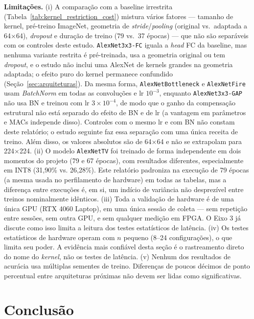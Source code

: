 \documentclass[conference]{IEEEtran}
\begin{document}
\textbf{Limitações.} (i) A comparação com a baseline irrestrita (Tabela~\ref{tab:kernel_restriction_cost})
mistura vários fatores — tamanho de kernel, pré-treino ImageNet, geometria de
\textit{stride}/\textit{pooling} (original vs.\ adaptada a 64$\times$64), \textit{dropout} e duração
de treino (79 vs.\ 37 épocas) — que não são separáveis com os controles deste estudo.
\texttt{AlexNet3x3-FC} iguala a \textit{head} FC da baseline, mas nenhuma variante restrita é
pré-treinada, usa a geometria original ou tem \textit{dropout}, e o estudo não inclui uma AlexNet de
kernels grandes na geometria adaptada; o efeito puro do kernel permanece confundido
(Seção~\ref{sec:arquiteturas}). Da mesma forma, \texttt{AlexNetBottleneck} e \texttt{AlexNetFire}
usam \textit{BatchNorm} em todas as convoluções e lr $10^{-3}$, enquanto \texttt{AlexNet3x3-GAP}
não usa BN e treinou com lr $3\times10^{-4}$, de modo que o ganho da compensação estrutural não está
separado do efeito de BN e de lr (a vantagem em parâmetros e MACs independe disso). Controles com o
mesmo lr e com BN não constam deste relatório; o estudo seguinte \cite{souza2026artigo} faz essa
separação com uma única receita de treino. Além disso, os
valores absolutos são de 64$\times$64 e não se
extrapolam para 224$\times$224. (ii) O modelo \texttt{AlexNetTV} foi treinado de forma
independente em dois momentos do projeto (79 e 67 épocas), com resultados diferentes,
especialmente em INT8 (31,90\% vs. 26,28\%). Este relatório padroniza na execução de 79 épocas
(a mesma usada no perfilamento de hardware) em todas as tabelas, mas a diferença entre execuções
é, em si, um indício de variância não desprezível entre treinos nominalmente idênticos. (iii) Toda
a validação de hardware é de uma única GPU (RTX 4060 Laptop), em uma única sessão de coleta — sem
repetição entre sessões, sem outra GPU, e sem qualquer medição em FPGA. O Eixo 3 já discute
como isso limita a leitura dos testes estatísticos de latência. (iv) Os testes estatísticos de
hardware operam com $n$ pequeno (8--24 configurações), o que limita seu poder. A evidência mais
confiável desta seção é o rastreamento direto do nome do \textit{kernel}, não os testes de
latência. (v) Nenhum dos resultados de acurácia usa múltiplas sementes de treino. Diferenças de
poucos décimos de ponto percentual entre arquiteturas próximas não devem ser lidas como
significativas.

\section{Conclusão}
\end{document}
